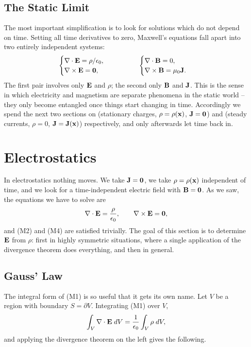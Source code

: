 \documentclass[a4paper]{scrartcl}
\begin{document}
\subsection{The Static Limit}

The most important simplification is to look for solutions which do not depend on time. Setting all time derivatives to zero, Maxwell's equations fall apart into two entirely independent systems:
$$
\begin{cases}
	\nabla \cdot \mathbf{E} = \rho/\epsilon_0, \\
	\nabla \times \mathbf{E} = \mathbf{0},
\end{cases}
\qquad \qquad
\begin{cases}
	\nabla \cdot \mathbf{B} = 0, \\
	\nabla \times \mathbf{B} = \mu_0 \mathbf{J}.
\end{cases}
$$
The first pair involves only $\mathbf{E}$ and $\rho$; the second only $\mathbf{B}$ and $\mathbf{J}$. This is the sense in which electricity and magnetism are separate phenomena in the static world -- they only become entangled once things start changing in time. Accordingly we spend the next two sections on  (stationary charges, $\rho = \rho(\mathbf{x})$, $\mathbf{J} = \mathbf{0}$) and  (steady currents, $\rho = 0$, $\mathbf{J} = \mathbf{J}(\mathbf{x})$) respectively, and only afterwards let time back in.

\section{Electrostatics}

In electrostatics nothing moves. We take $\mathbf{J} = \mathbf{0}$, we take $\rho = \rho(\mathbf{x})$ independent of time, and we look for a time-independent electric field with $\mathbf{B} = \mathbf{0}$. As we saw, the equations we have to solve are
$$
\nabla \cdot \mathbf{E} = \frac{\rho}{\epsilon_0}, \qquad \nabla \times \mathbf{E} = \mathbf{0},
$$
and (M2) and (M4) are satisfied trivially. The goal of this section is to determine $\mathbf{E}$ from $\rho$: first in highly symmetric situations, where a single application of the divergence theorem does everything, and then in general.

\subsection{Gauss' Law}

The integral form of (M1) is so useful that it gets its own name. Let $V$ be a region with boundary $S = \partial V$. Integrating (M1) over $V$,
$$
\int_V \nabla \cdot \mathbf{E} \; d V = \frac{1}{\epsilon_0}\int_V \rho \; d V,
$$
and applying the divergence theorem on the left gives the following.
\end{document}

